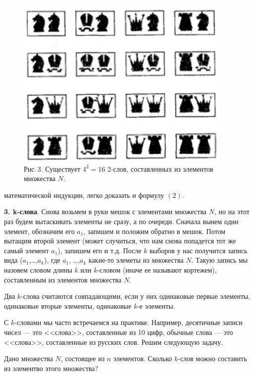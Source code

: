 \documentclass[11pt, a4paper, twocolumn]{report}
\begin{document}
\begin{figure}[t]
\includegraphics[width=\linewidth]{second.png}
\footnotesize
Рис.\,3. Существует $4^2 = 16$ 2-слов, составленных из элементов множества $N$.
\end{figure}

\noindent математической индукции, легко доказать и формулу $ (2) $.

\textbf{3. k-слова}. Снова возьмем в руки мешок с элементами множества $N$, но на этот раз будем вытаскивать элементы не сразу, а по очереди. Сначала вынем один элемент, обозначим его $a_1$, запишем и положим обратно в мешок. Потом вытащим второй элемент (может случиться, что нам снова попадется тот же самый элемент $a_1$), запишем его и т.д. После $k$ выборов у нас получится запись вида ($a_1$,\dots,$a_k$), где $a_1$, \dots,$a_k$ какие-то элеметы из множества $N$. Такую запись мы назовем словом длины $k$ или $k$-словом (иначе ее называют кортежем), составленным из элементов множества $N$.

Два $k$-слова считаются совпадающими, если у них одинаковые первые элементы, одинаковые вторые элементы, одинаковые $k$-е элементы.

С $k$-словами мы часто встречаемся на практике. Например, десятичные записи чисел --- это <<слова>>, составленные из 10 цифр, обычные слова --- это <<слова>>, составленные из русских слов. Решим следующую задачу.

Дано множества $N$, состоящее из $n$ элементов. Сколько $k$-слов можно составить из элементво этого множества?
\end{document}
